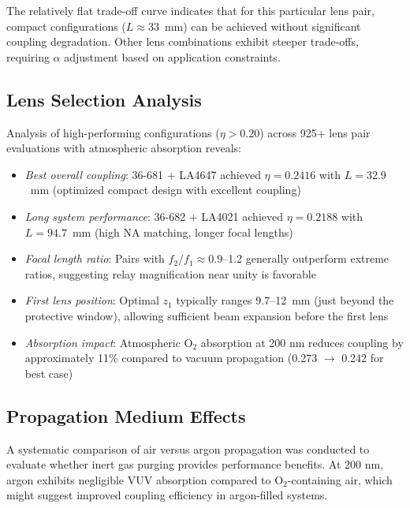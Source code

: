 The relatively flat trade-off curve indicates that for this particular lens pair, compact configurations ($L \approx 33$~mm) can be achieved without significant coupling degradation. Other lens combinations exhibit steeper trade-offs, requiring $\alpha$ adjustment based on application constraints.

\subsection{Lens Selection Analysis}

Analysis of high-performing configurations ($\eta > 0.20$) across 925+ lens pair evaluations with atmospheric absorption reveals:

\begin{itemize}[leftmargin=*]
    \item \textit{Best overall coupling}: 36-681 + LA4647 achieved $\eta = 0.2416$ with $L = 32.9$~mm (optimized compact design with excellent coupling)
    
    \item \textit{Long system performance}: 36-682 + LA4021 achieved $\eta = 0.2188$ with $L = 94.7$~mm (high NA matching, longer focal lengths)
    
    \item \textit{Focal length ratio}: Pairs with $f_2/f_1 \approx 0.9$--1.2 generally outperform extreme ratios, suggesting relay magnification near unity is favorable
    
    \item \textit{First lens position}: Optimal $z_1$ typically ranges 9.7--12~mm (just beyond the protective window), allowing sufficient beam expansion before the first lens
    
    \item \textit{Absorption impact}: Atmospheric O$_2$ absorption at 200 nm reduces coupling by approximately 11\% compared to vacuum propagation (0.273 $\rightarrow$ 0.242 for best case)
\end{itemize}

\subsection{Propagation Medium Effects}

A systematic comparison of air versus argon propagation was conducted to evaluate whether inert gas purging provides performance benefits. At 200 nm, argon exhibits negligible VUV absorption compared to O$_2$-containing air, which might suggest improved coupling efficiency in argon-filled systems.


